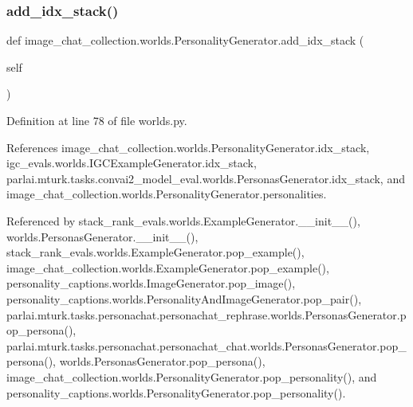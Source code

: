 \subsubsection{\texorpdfstring{add\+\_\+idx\+\_\+stack()}{add\_idx\_stack()}}
{\footnotesize\ttfamily def image\+\_\+chat\+\_\+collection.\+worlds.\+Personality\+Generator.\+add\+\_\+idx\+\_\+stack (\begin{DoxyParamCaption}\item[{}]{self }\end{DoxyParamCaption})}



Definition at line 78 of file worlds.\+py.



References image\+\_\+chat\+\_\+collection.\+worlds.\+Personality\+Generator.\+idx\+\_\+stack, igc\+\_\+evals.\+worlds.\+I\+G\+C\+Example\+Generator.\+idx\+\_\+stack, parlai.\+mturk.\+tasks.\+convai2\+\_\+model\+\_\+eval.\+worlds.\+Personas\+Generator.\+idx\+\_\+stack, and image\+\_\+chat\+\_\+collection.\+worlds.\+Personality\+Generator.\+personalities.



Referenced by stack\+\_\+rank\+\_\+evals.\+worlds.\+Example\+Generator.\+\_\+\+\_\+init\+\_\+\+\_\+(), worlds.\+Personas\+Generator.\+\_\+\+\_\+init\+\_\+\+\_\+(), stack\+\_\+rank\+\_\+evals.\+worlds.\+Example\+Generator.\+pop\+\_\+example(), image\+\_\+chat\+\_\+collection.\+worlds.\+Example\+Generator.\+pop\+\_\+example(), personality\+\_\+captions.\+worlds.\+Image\+Generator.\+pop\+\_\+image(), personality\+\_\+captions.\+worlds.\+Personality\+And\+Image\+Generator.\+pop\+\_\+pair(), parlai.\+mturk.\+tasks.\+personachat.\+personachat\+\_\+rephrase.\+worlds.\+Personas\+Generator.\+pop\+\_\+persona(), parlai.\+mturk.\+tasks.\+personachat.\+personachat\+\_\+chat.\+worlds.\+Personas\+Generator.\+pop\+\_\+persona(), worlds.\+Personas\+Generator.\+pop\+\_\+persona(), image\+\_\+chat\+\_\+collection.\+worlds.\+Personality\+Generator.\+pop\+\_\+personality(), and personality\+\_\+captions.\+worlds.\+Personality\+Generator.\+pop\+\_\+personality().

